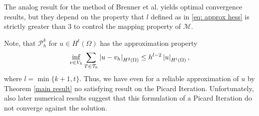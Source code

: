 The analog result for the method of Brenner et al. \cite[Theorem 3.1]{BGN+2011} yields optimal convergence results, but they depend on the property that $l$ defined as in \eqref{eq: approx hess} is strictly greater than $3$ to control the mapping property of $\mathcal M$.
	
Note, that $\mathcal P^k_h$ for $u \in H^t(\Omega)$ has the approximation property 
\begin{align}
	\inf_{v \in V_h} \sum_{T \in \mathcal{T}_h} \left| u-v_h \right|_{H^2(\Omega)} \leq h^{l-2} \left| u \right|_{H^l(\Omega)}, \label{eq: approx hess}
\end{align}
where $l = \min\{k+1,t\}$. Thus, we have even for a reliable approximation of $u$ by Theorem \ref{main result} no satisfying result on the Picard Iteration. 
Unfortunately, also later numerical results suggest that this formulation of a Picard Iteration do not converge against the \MA solution.	
	